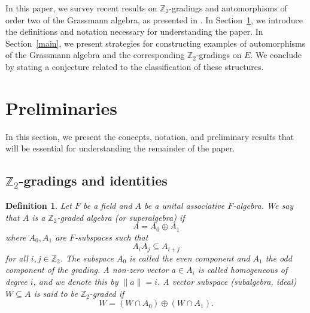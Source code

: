 \documentclass{article}
\newtheorem{definition}[theorem]{Definition}
\begin{document}
	
	
	
	
	
	
	
	
	
	
	In this paper, we survey recent results on $\mathbb{Z}_2$-gradings and automorphisms of order two of the Grassmann algebra, as presented in \cite{agpkauto, anagomes}. In Section~\ref{prmilinaries}, we introduce the definitions and notation necessary for understanding the paper. In Section~\ref{main}, we present strategies for constructing examples of automorphisms of the Grassmann algebra and the corresponding $\mathbb{Z}_2$-gradings on $E$. We conclude by stating a conjecture related to the classification of these structures.
	
	
	
	
	
	
	
	
	
	
	
	
	
	
	
	
	
	
	
	
	\section{Preliminaries}\label{prmilinaries}
	
	In this section, we present the concepts, notation, and preliminary results that will be essential for understanding the remainder of the paper.
	
	\subsection{$\mathbb{Z}_2$-gradings and identities}
	
	\begin{definition}
		Let $F$ be a field and $A$ be a unital associative $F$-algebra. We say that $A$ is a \emph{$\mathbb{Z}_2$-graded algebra} (or \emph{superalgebra}) if
		\[
		A = A_0 \oplus A_1
		\]
		where $A_0, A_1$ are $F$-subspaces such that
		\[
		A_i A_j \subseteq A_{i+j}
		\]
		for all $i, j \in \mathbb{Z}_2$. The subspace $A_0$ is called the \emph{even component} and $A_1$ the \emph{odd component} of the grading. A non-zero vector $a \in A_i$ is called \emph{homogeneous of degree} $i$, and we denote this by $\|a\| = i$. A vector subspace (subalgebra, ideal) $W \subseteq A$ is said to be \emph{$\mathbb{Z}_2$-graded} if
		\[
		W = (W \cap A_0) \oplus (W \cap A_1).
		\]
	\end{definition}
	
\end{document}
